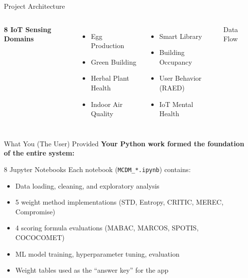 \documentclass[aspectratio=169]{beamer}
\begin{document}
\begin{frame}[allowframebreaks]{Project Architecture}
\begin{columns}
    \vspace{0.3cm}
    \textbf{8 IoT Sensing Domains}
    \begin{columns}
      \begin{itemize}
        \item Egg Production
        \item Green Building
        \item Herbal Plant Health
        \item Indoor Air Quality
      \end{itemize}
      \begin{itemize}
        \item Smart Library
        \item Building Occupancy
        \item User Behavior (RAED)
        \item IoT Mental Health
      \end{itemize}
    \end{columns}
    \begin{block}{Data Flow}
      \centering
    \end{block}
  \end{columns}
\end{frame}

\begin{frame}{What You (The User) Provided}
  \textbf{Your Python work formed the foundation of the entire system:}

  \vspace{0.3cm}
  \begin{block}{8 Jupyter Notebooks}
    Each notebook (\texttt{MCDM\_*.ipynb}) contains:
    \begin{itemize}
      \item Data loading, cleaning, and exploratory analysis
      \item 5 weight method implementations (STD, Entropy, CRITIC, MEREC, Compromise)
      \item 4 scoring formula evaluations (MABAC, MARCOS, SPOTIS, COCOCOMET)
      \item ML model training, hyperparameter tuning, evaluation
      \item Weight tables used as the ``answer key'' for the app
    \end{itemize}
  \end{block}
\end{frame}
\end{document}
